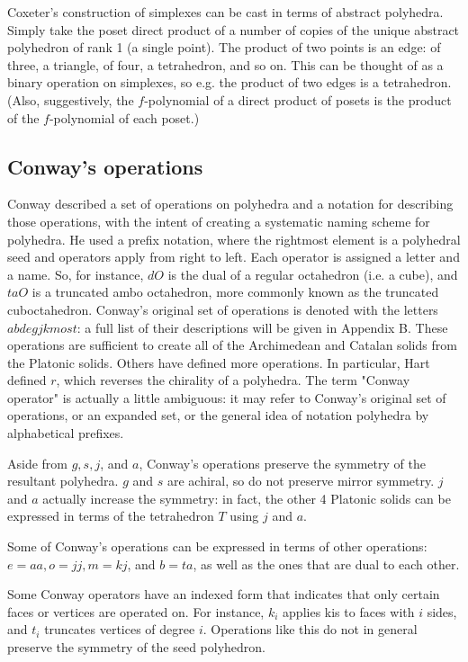 \documentclass{amsart}[12pt]
\begin{document}
Coxeter's construction of simplexes can be cast in terms of abstract polyhedra.
Simply take the poset direct product of a number of copies of the unique
abstract polyhedron of rank 1 (a single point). The product of two points is an
edge: of three, a triangle, of four, a tetrahedron, and so on. This can be
thought of as a binary operation on simplexes, so e.g. the product of two edges
is a tetrahedron. (Also, suggestively, the $f$-polynomial of a direct product
of posets is the product of the $f$-polynomial of each poset.)

\subsection{Conway's operations}
Conway described a set of operations on polyhedra and a notation for describing
those operations, with the intent of creating a systematic naming scheme for
polyhedra.\cite{conway} He used a prefix notation, where the rightmost element
is a polyhedral seed and operators apply from right to left. Each operator is
assigned a letter and a name. So, for instance, $dO$ is the dual of a regular
octahedron (i.e. a cube), and $taO$ is a truncated ambo octahedron, more
commonly known as the truncated cuboctahedron. Conway's original set of
operations is denoted with the letters $abdegjkmost$: a full list of their
descriptions will be given in Appendix B. These operations are sufficient to
create all of the Archimedean and Catalan solids from the Platonic solids.
Others have defined more operations.
\cite{hart98}\cite{hart00}\cite{antiprism} In particular, Hart \cite{hart98}
defined $r$, which reverses the chirality of a polyhedra. The term "Conway
operator" is actually a little ambiguous: it may refer to Conway's original
set of operations, or an expanded set, or the general idea of notation
polyhedra by alphabetical prefixes.

Aside from $g, s, j$, and $a$, Conway's operations preserve the
symmetry of the resultant polyhedra. $g$ and $s$ are achiral, so
do not preserve mirror symmetry. $j$ and $a$ actually increase
the symmetry: in fact, the other 4 Platonic solids can be expressed
in terms of the tetrahedron $T$ using $j$ and $a$.

Some of Conway's operations can be expressed in terms of other operations:
$e=aa, o=jj, m=kj$, and $b=ta$, as well as the ones that are dual to each other.

Some Conway operators have an indexed form that indicates that only certain faces or
vertices are operated on. For instance, $k_i$ applies kis to faces with
$i$ sides, and $t_i$ truncates vertices of degree $i$.
Operations like this do not in general preserve the symmetry of the seed
polyhedron.
\end{document}
